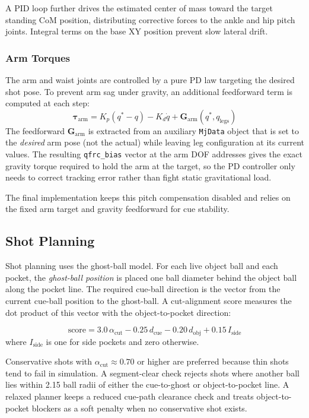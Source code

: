 \documentclass[letterpaper, 12 pt, conference]{ieeeconf}
\begin{document}
A PID loop further drives the estimated center of mass toward the target
standing CoM position, distributing corrective forces to the ankle and hip pitch
joints. Integral terms on the base XY position prevent slow lateral drift.

\subsubsection{Arm Torques}

The arm and waist joints are controlled by a pure PD law targeting the desired
shot pose. To prevent arm sag under gravity, an additional feedforward term is
computed at each step:
\begin{equation}
  \boldsymbol{\tau}_\text{arm} = K_p(q^* - q) - K_d \dot{q}
    + \mathbf{G}_\text{arm}(q^*, q_\text{legs})
\end{equation}
The feedforward $\mathbf{G}_\text{arm}$ is extracted from an auxiliary
\texttt{MjData} object that is set to the \emph{desired} arm pose (not the
actual) while leaving leg configuration at its current values. The resulting
\texttt{qfrc\_bias} vector at the arm DOF addresses gives the exact gravity torque
required to hold the arm at the target, so the PD controller only needs to
correct tracking error rather than fight static gravitational load.

The final implementation keeps this pitch compensation disabled and relies on
the fixed arm target and gravity feedforward for cue stability.

\subsection{Shot Planning}

Shot planning uses the ghost-ball model. For each live object ball and each
pocket, the \emph{ghost-ball position} is placed one ball diameter behind the
object ball along the pocket line. The required cue-ball direction is
the vector from the current cue-ball position to the ghost-ball. A cut-alignment
score measures the dot product of this vector with the object-to-pocket
direction:

\begin{equation}
  \text{score} = 3.0\,\alpha_\text{cut}
               - 0.25\,d_\text{cue}
               - 0.20\,d_\text{obj}
               + 0.15\,I_\text{side}
\end{equation}
where $I_\text{side}$ is one for side pockets and zero otherwise.

Conservative shots with $\alpha_\text{cut} \approx 0.70$ or higher are preferred
because thin shots tend to fail in simulation. A segment-clear check rejects shots
where another ball lies within 2.15 ball radii of either the cue-to-ghost or
object-to-pocket line. A relaxed planner keeps a reduced cue-path clearance
check and treats object-to-pocket blockers as a soft penalty when no conservative
shot exists.
\end{document}
